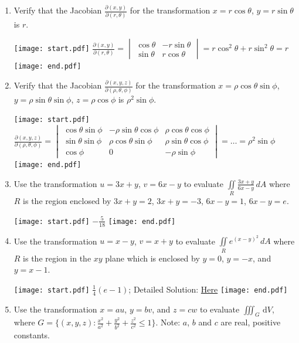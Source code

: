 \documentclass[12pt]{article}
\begin{document}
\begin{enumerate}
\begin{enumerate}
\end{enumerate}

\item Verify that the Jacobian $\frac{\partial(x,y)}{\partial(r,\theta)}$ for the transformation $x=r\cos{\theta}$, $y=r\sin{\theta}$ is $r$.

\texttt{[image: start.pdf]}
{{$\frac{\partial(x,y)}{\partial(r,\theta)}=\begin{vmatrix}\cos{\theta} & -r\sin{\theta}\\ \sin{\theta} & r\cos{\theta}\end{vmatrix}=r\cos^2{\theta}+r\sin^2{\theta}=r$}}
\texttt{[image: end.pdf]}


\item Verify that the Jacobian $\frac{\partial(x,y,z)}{\partial(\rho,\theta,\phi)}$ for the transformation $x=\rho\cos{\theta}\sin{\phi}$, $y=\rho\sin{\theta}\sin{\phi}$, $z=\rho\cos{\phi}$ is $\rho^2\sin{\phi}$.

\texttt{[image: start.pdf]}
{{$\frac{\partial(x,y,z)}{\partial(\rho,\theta,\phi)}=\begin{vmatrix} \cos{\theta}\sin{\phi} & -\rho\sin{\theta}\cos{\phi} & \rho\cos{\theta}\cos{\phi}\\ \sin{\theta}\sin{\phi} & \rho\cos{\theta}\sin{\phi} & \rho\sin{\theta}\cos{\phi}\\ \cos{\phi} & 0 & -\rho\sin{\phi} \end{vmatrix}=\dots = \rho^2\sin{\phi}$}}
\texttt{[image: end.pdf]}


\item Use the transformation $u=3x+y$, $v=6x-y$ to evaluate $\iint \limits_{R} \frac{3x+y}{6x-y} \,dA$ where $R$ is the region enclosed by $3x+y=2$, $3x+y=-3$, $6x-y=1$, $6x-y=e$.

\texttt{[image: start.pdf]}
{{$-\frac{5}{18}$}}
\texttt{[image: end.pdf]}


\item Use the transformation $u=x-y$, $v=x+y$ to evaluate $\iint \limits_{R} e^{(x-y)^2} \,dA$ where $R$ is the region in the $xy$ plane which is enclosed by $y=0$, $y=-x$, and $y=x-1$.

\texttt{[image: start.pdf]}
{{$\frac{1}{4}(e-1)$; Detailed Solution: \textcolor{blue}{\href{http://www.math.drexel.edu/classes/Calculus/resources/Math200HW/Solutions/21_200_COV_08.pdf}{Here}}}}
\texttt{[image: end.pdf]}


\item Use the transformation $x=au$, $y=bv$, and $z=cw$ to evaluate $\displaystyle \iiint_{G}  \,\mathrm{d}V$, where $G = \displaystyle \big\{ (x,y,z) : \frac{x^2}{a^2}+\frac{y^2}{b^2}+\frac{z^2}{c^2}\leq 1 \big\}$.  Note: $a$, $b$ and $c$ are real, positive constants.


\end{enumerate}
\end{document}
